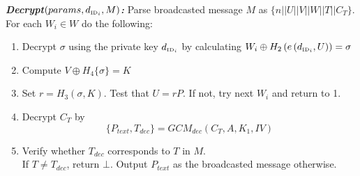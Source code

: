 \documentclass[11pt]{article}
\begin{document}
\newpage
\textbf{\textit{Decrypt$\left( params, d_{\textrm{\tiny{ID}}_i}, M \right)$:}} Parse broadcasted message $M$ as $\{ n || U || V || W || T || C_T \}$. For each $W_i \in W$ do the following:
\begin{enumerate}
  \item Decrypt $\sigma$ using the private key $d_{\textrm{\tiny{ID}}_i}$ by calculating $W_i \oplus H_2 \left( e \left( d_{\textrm{\tiny{ID}}_i}, U \right) \right) = \sigma$
  \item Compute $V \oplus H_4 \{ \sigma \} = K$
  \item Set $r = H_3 \left( \sigma, K \right)$. Test that $U = rP$. If not, try next $W_i$ and return to 1.
 \item Decrypt $C_T$ by
  \begin{equation*}
   \{ P_{text}, T_{dec} \} = GCM_{dec} \left( C_T, A, K_1, IV \right)
  \end{equation*}
  
 \item Verify whether $T_{dec}$ corresponds to $T$ in $M$.\\ If $T \neq T_{dec}$, return $\bot$. Output $P_{text}$ as the broadcasted message otherwise.

\end{enumerate}
\end{document}
